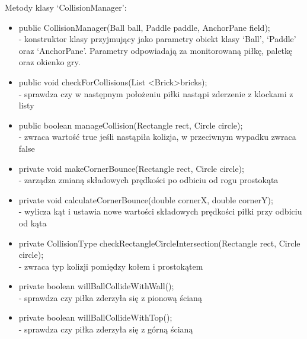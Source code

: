 \documentclass[a4paper]{article}
\begin{document}
\bigskip
Metody klasy ‘CollisionManager’:
\begin{itemize}
\item public CollisionManager(Ball ball, Paddle paddle, AnchorPane field);\\
- konstruktor klasy przyjmujący jako parametry obiekt klasy ‘Ball’, ‘Paddle’ oraz ‘AnchorPane’. Parametry odpowiadają za monitorowaną piłkę, paletkę oraz okienko gry.

\item public void checkForCollisions(List \textless Brick\textgreater bricks);\\
- sprawdza czy w następnym położeniu piłki nastąpi zderzenie z klockami z listy

\item public boolean manageCollision(Rectangle rect, Circle circle);\\
- zwraca wartość true jeśli nastąpiła kolizja, w przeciwnym wypadku zwraca false
    
\item private void makeCornerBounce(Rectangle rect, Circle circle);\\
- zarządza zmianą składowych prędkości po odbiciu od rogu prostokąta
    
\item private void calculateCornerBounce(double cornerX, double cornerY);\\
- wylicza kąt i ustawia nowe wartości składowych prędkości piłki przy odbiciu od kąta
    
\item private CollisionType checkRectangleCircleIntersection(Rectangle rect, Circle circle);\\
- zwraca typ kolizji pomiędzy kołem i prostokątem
    
\item private boolean willBallCollideWithWall();\\
- sprawdza czy piłka zderzyła się z pionową ścianą

\item private boolean willBallCollideWithTop();\\
- sprawdza czy piłka zderzyła się z górną ścianą
\end{itemize}
\bigskip
\end{document}
